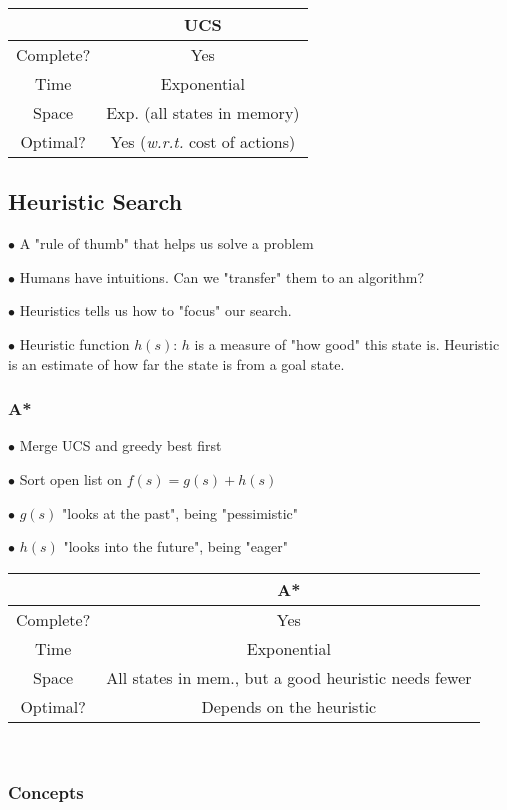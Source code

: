 \documentclass[english,openany]{book}
\begin{document}
    \begin{tabular}{|c|c|}
        \hline
        & UCS  \\
        \hline
        Complete? & Yes \\
        Time & Exponential\\
        Space & Exp. (all states in memory)\\
        Optimal? & Yes (\textit{w.r.t.} cost of actions)\\
        \hline
    \end{tabular}

    \subsection{Heuristic Search}

    $\bullet$ A "rule of thumb" that helps us solve a problem

    $\bullet$ Humans have intuitions. Can we "transfer" them to an algorithm?

    $\bullet$ Heuristics tells us how to "focus" our search.

    $\bullet$ Heuristic function $h(s)$: $h$ is a measure of "how good" this state is. Heuristic is an estimate of how far the state is from a goal state.

    \subsubsection{A*}

    $\bullet$ Merge UCS and greedy best first

    $\bullet$ Sort open list on $f(s) = g(s) + h(s)$

    $\bullet$ $g(s)$ "looks at the past", being "pessimistic"

    $\bullet$ $h(s)$ "looks into the future", being "eager"

    \begin{tabular}{|c|c|}
        \hline
        & A*  \\
        \hline
        Complete? & Yes \\
        Time & Exponential\\
        Space & All states in mem., but a good heuristic needs fewer\\
        Optimal? & Depends on the heuristic\\
        \hline
    \end{tabular}\\

    \subsubsection{Concepts}
\end{document}

